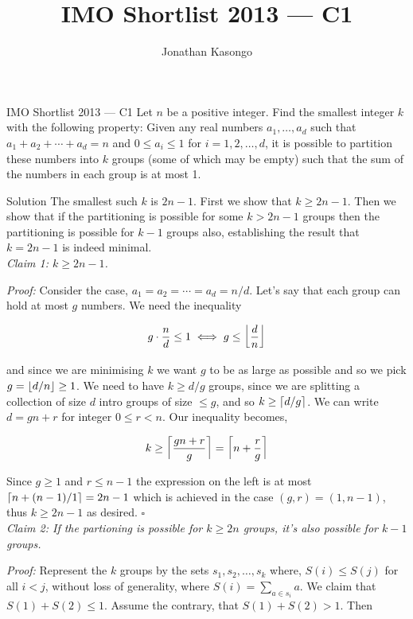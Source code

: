\documentclass{article}
\author{Jonathan Kasongo}
\title{IMO Shortlist 2013 --- C1}
\begin{document}
\maketitle

\begin{problem}{IMO Shortlist 2013 --- C1}
Let $n$ be a positive integer. Find the smallest integer $k$ with the
following property: Given any real numbers $a_1, \ldots ,a_d$ such that
$a_1 + a_2 + \cdots + a_d = n$ and $0 \leq a_i \leq 1$ for
$i = 1, 2, \ldots, d$, it is possible to partition these numbers into $k$
groups (some of which may be empty) such that the sum of the numbers in
each group is at most 1.
\end{problem}

\begin{solution}{Solution}
The smallest such $k$ is $2n-1$. First we show that $k \geq 2n-1$. Then
we show that if the partitioning is possible for some $k > 2n-1$ groups
then the partitioning is possible for $k-1$ groups also, establishing
the result that $k = 2n-1$ is indeed minimal.\\

\textit{Claim 1: $k \geq 2n-1$.}\vspace{0.2cm}

\textit{Proof:} Consider the case, $a_1 = a_2 = \cdots = a_d = n/d$.
Let's say that each group can hold at most $g$ numbers. We need the
inequality

$$
g \cdot \frac{n}{d} \leq 1 \iff g \leq \left\lfloor \frac{d}{n} \right\rfloor
$$

and since we are minimising $k$ we want $g$ to be as large as possible and
so we pick $g = \left\lfloor d/n \right\rfloor \geq 1$. We need to have $k \geq d/g$ groups,
since we are splitting a collection of size $d$ intro groups of size
$\leq g$, and so $k \geq \left\lceil d/g \right\rceil$. We can write $d = gn + r$ for
integer $0 \leq r < n$. Our inequality becomes,

$$
k \geq \left\lceil \frac{gn + r}{g} \right\rceil = \left\lceil n + \frac{r}{g} \right\rceil
$$

Since $g\geq 1$ and $r \leq n-1$ the expression on the left is at most
$\left\lceil n + (n-1)/1 \right\rceil = 2n-1$ which is achieved in the case
$(g, r) = (1, n-1)$, thus $k \geq 2n-1$ as desired. $\square$ \\

\textit{Claim 2: If the partioning is possible for $k \geq 2n$ groups,
it's also possible for $k-1$ groups.} \vspace{0.2cm}

\textit{Proof:} Represent the $k$ groups by the sets
$s_1, s_2, \ldots, s_k$ where, $S(i) \leq S(j)$ for all $i<j$, without loss
of generality, where $S(i) = \sum_{a\in s_i} a$. We claim that
$S(1) + S(2) \leq 1$. Assume the contrary, that $S(1) + S(2) > 1$. Then


\end{solution}
\end{document}
